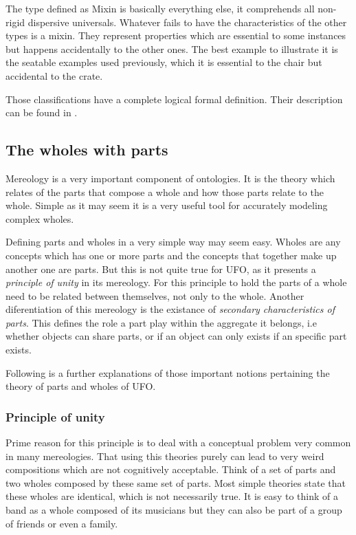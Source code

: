The type defined as Mixin is basically everything else, it comprehends all non-rigid dispersive universals. Whatever fails to have the characteristics of the other types is a mixin. They represent properties which are essential to some instances but happens accidentally to the other ones. The best example to illustrate it is the seatable examples used previously, which it is essential to the chair but accidental to the crate.

Those classifications have a complete logical formal definition. Their description can be found in \cite{guizzardi_ontological_2005}.

\subsection{The wholes with parts}

Mereology is a very important component of ontologies. It is the theory which relates of the parts that compose a whole and how those parts relate to the whole. Simple as it may seem it is a very useful tool for accurately modeling complex wholes.

Defining parts and wholes in a very simple way may seem easy. Wholes are any concepts which has one or more parts and the concepts that together make up another one are parts. But this is not quite true for UFO, as it presents a \textit{principle of unity} in its mereology. For this principle to hold the parts of a whole need to be related between themselves, not only to the whole. Another diferentiation of this mereology is the existance of \textit{secondary characteristics of parts}. This defines the role a part play within the aggregate it belongs, i.e whether objects can share parts, or if an object can only exists if an specific part exists. 

Following is a further explanations of those important notions pertaining the theory of parts and wholes of UFO.

\subsubsection{Principle of unity}

Prime reason for this principle is to deal with a conceptual problem very common in many mereologies. That using this theories purely can lead to very weird compositions which are not cognitively acceptable. Think of a set of parts and two wholes composed by these same set of parts. Most simple theories state that these wholes are identical, which is not necessarily true. It is easy to think of a band as a whole composed of its musicians but they can also be part of a group of friends or even a family. 

